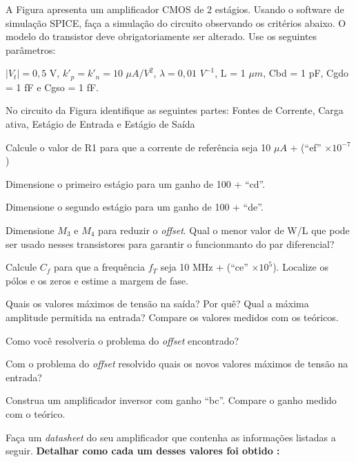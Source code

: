 \documentclass[addpoints]{exam}
\begin{document}
\vspace{5mm}

A Figura apresenta um amplificador CMOS de 2 estágios. Usando o software de simulação SPICE, faça a simulação do circuito observando os critérios abaixo. O modelo do transistor deve obrigatoriamente ser alterado. Use os seguintes parâmetros:

\vspace{2mm}

$\vert V_t \vert = 0,5$ V, $k'_p = k'_n = 10$ $\mu A/V^2$, $\lambda = 0,01$ $V^{-1}$, L = 1 $\mu m$, Cbd = 1 pF, Cgdo = 1 fF e Cgso = 1 fF.

\vspace{5mm}

\begin{questions}

\question No circuito da Figura identifique as seguintes partes: Fontes de Corrente, Carga ativa, Estágio de Entrada e Estágio de Saída

\question Calcule o valor de R1 para que a corrente de referência seja 10 $\mu A$ + (``ef'' $\times10^{-7}$)

\question Dimensione o primeiro estágio para um ganho de 100 + ``cd''.

\question Dimensione o segundo estágio para um ganho de 100 + ``de''.

\question Dimensione $M_3$ e $M_4$ para reduzir o \textit{offset}. Qual o menor valor de W/L que pode ser usado nesses transistores para garantir o funcionmanto do par diferencial?

\question Calcule $C_f$ para que a frequência $f_T$ seja 10 MHz + (``ce'' $\times10^5$). Localize os pólos e os zeros e estime a margem de fase.

\question Quais os valores máximos de tensão na saída? Por quê? Qual a máxima amplitude permitida na entrada? Compare os valores medidos com os teóricos.

\question Como você resolveria o problema do \textit{offset} encontrado?

\question Com o problema do \textit{offset} resolvido quais os novos valores máximos de tensão na entrada?

\question Construa um amplificador inversor com ganho ``bc''. Compare o ganho medido com o teórico.

\question Faça um \textit{datasheet} do seu amplificador que contenha as informações listadas a seguir. \textbf{Detalhar como cada um desses valores foi obtido :}


\end{questions}
\end{document}
